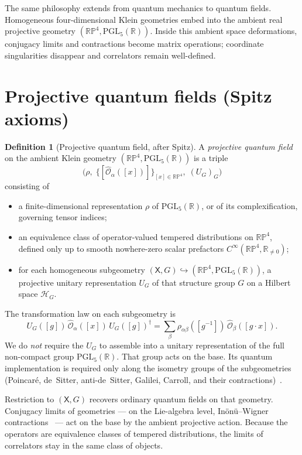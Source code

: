 \documentclass{article}
\theoremstyle{definition}
\newtheorem{definition}{Definition}
\newcommand{\RP}{\mathbb{RP}}
\newcommand{\R}{\mathbb{R}}
\newcommand{\PGL}{\mathrm{PGL}}
\newcommand{\Hilb}{\mathcal{H}}
\begin{document}
The same philosophy extends from quantum mechanics to quantum fields.
Homogeneous four-dimensional Klein geometries embed into the ambient real
projective geometry \((\RP^4,\PGL_5(\R))\).  Inside this ambient space
deformations, conjugacy limits and contractions become matrix operations;
coordinate singularities disappear and correlators remain well-defined.

\section{Projective quantum fields (Spitz axioms)}

\begin{definition}[Projective quantum field, after Spitz]
A \emph{projective quantum field} on the ambient Klein geometry
\((\RP^4,\PGL_5(\R))\) is a triple
\[
\bigl(\rho,\;\{[\hat{\mathcal{O}}_\alpha([x])]\}_{[x]\in\RP^4},\;
      (U_G)_G\bigr)
\]
consisting of
\begin{itemize}
  \item a finite-dimensional representation \(\rho\) of \(\PGL_5(\R)\),
        or of its complexification, governing tensor indices;
  \item an equivalence class of operator-valued tempered distributions on
        \(\RP^4\), defined only up to smooth nowhere-zero scalar prefactors
        \(C^\infty(\RP^4,\R_{\neq 0})\);
  \item for each homogeneous subgeometry
        \((\mathsf{X},G)\hookrightarrow(\RP^4,\PGL_5(\R))\), a projective
        unitary representation \(U_G\) of that structure group \(G\) on a
        Hilbert space \(\Hilb_G\).
\end{itemize}
The transformation law on each subgeometry is
\[
U_G([g])\,\hat{\mathcal{O}}_\alpha([x])\,U_G([g])^\dagger
  = \sum_\beta\rho_{\alpha\beta}([g^{-1}])\,
    \hat{\mathcal{O}}_\beta([g\cdot x]).
\]
We do \emph{not} require the \(U_G\) to assemble into a unitary representation
of the full non-compact group \(\PGL_5(\R)\).  That group acts on the base.
Its quantum implementation is required only along the isometry groups of the
subgeometries (Poincar\'e, de~Sitter, anti-de~Sitter, Galilei, Carroll, and
their contractions)~\cite{Spitz2024}.
\end{definition}

Restriction to \((\mathsf{X},G)\) recovers ordinary quantum fields on that
geometry.  Conjugacy limits of geometries --- on the Lie-algebra level,
In\"on\"u--Wigner contractions~\cite{InonuWigner} --- act on the base by the
ambient projective action.  Because the operators are equivalence classes of
tempered distributions, the limits of correlators stay in the same class of
objects.
\end{document}
